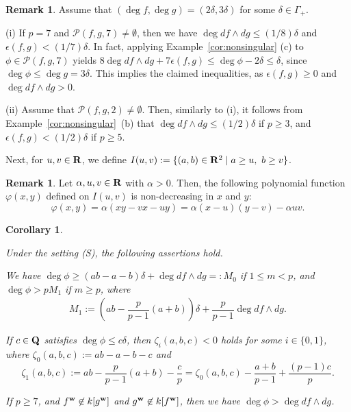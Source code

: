 \documentclass{amsart}
\theoremstyle{plain}
\newtheorem{cor}[thm]{Corollary}
\theoremstyle{definition}
\newtheorem{rem}[thm]{Remark}
\newcommand{\nd}{\noindent}
\newcommand{\R}{{\bf R}}
\newcommand{\Q}{{\bf Q}}
\newcommand{\ep}{\epsilon}
\newcommand{\w}{{\bf w}}
\begin{document}
\begin{rem}\label{rem:1/7}\rm 
Assume that 
$(\deg f,\deg g)=(2\delta ,3\delta )$ 
for some $\delta \in \Gamma _+$. 


\nd 
(i) 
If $p=7$ and $\mathcal{P}(f,g,7)\ne \emptyset $, 
then 
we have 
$\deg df\wedge dg\le (1/8)\delta $ and 
$\ep (f,g)<(1/7)\delta $. 
In fact, 
applying Example~\ref{cor:nonsingular} (c) to $\phi \in \mathcal{P}(f,g,7)$ 
yields 
$8\deg df\wedge dg+7\ep (f,g)\le \deg \phi -2\delta \le \delta $, 
since $\deg \phi \le \deg g=3\delta $. 
This implies the claimed inequalities, 
as $\ep (f,g)\ge 0$ and $\deg df\wedge dg>0$. 


\nd (ii) 
Assume that $\mathcal{P}(f,g,2)\ne \emptyset $. 
Then, 
similarly to (i), 
it follows from Example~\ref{cor:nonsingular}~(b) that 
$\deg df\wedge dg\le (1/2)\delta $ if $p\ge 3$, 
and $\ep (f,g)<(1/2)\delta $ if $p\ge 5$. 
\end{rem}



Next, for $u,v\in \R $, 
we define 
$I(u,v):=\{ (a,b)\in \R ^2\mid a\ge u,\ b\ge v\}$. 


\begin{rem}\label{rem:increasing function}\rm 
Let $\alpha ,u,v\in \R $ with $\alpha >0$. 
Then, the following polynomial function 
$\varphi (x,y)$ defined on $I(u,v)$ is non-decreasing in $x$ and $y$: 
$$
\varphi (x,y)=\alpha (xy-vx-uy)=\alpha (x-u)(y-v)-\alpha uv. 
$$
\end{rem}




\begin{cor}\label{cor:pSU0}

Under the setting {\rm (S)},
the following assertions hold. 


\nd{\rm (i)} 
We have $\deg \phi \ge 
(ab-a-b)\delta +\deg df\wedge dg=:M_0$ 
if $1\le m<p$, 
and $\deg \phi >pM_1$ if $m\ge p$, 
where 
\begin{align*}
M_1:=\left(ab-\dfrac{p}{p-1}(a+b)\right) \delta 
+\dfrac{p}{p-1}\deg df\wedge dg. 
\end{align*}




\nd{\rm (ii)} 
If $c\in \Q $ satisfies $\deg \phi \le c\delta $, 
then $\zeta _i(a,b,c)<0$ holds for some $i\in \{ 0,1\} $, 
where $\zeta _0(a,b,c):=ab-a-b-c$ and 
\begin{equation}\label{eq:zeta}
\zeta _1(a,b,c):=ab-\dfrac{p}{p-1}(a+b)-\dfrac{c}{p}
=\zeta _0(a,b,c)-\dfrac{a+b}{p-1}+\dfrac{(p-1)c}{p}. 
\end{equation}



\nd{\rm (iii)} 
If $p\ge 7$, 
and $f^{\w }\not\in k[g^{\w }]$ and $g^{\w }\not\in k[f^{\w }]$, 
then we have $\deg \phi >\deg df\wedge dg$. 
\end{cor}
\end{document}
